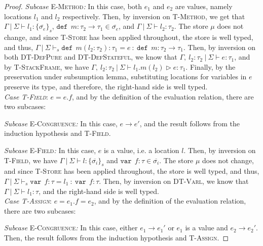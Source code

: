 \documentclass{llncs}
\newcommand{\keywadj}[1]{\mathtt{#1}}
\newcommand{\keyw}[1]{\keywadj{#1}~}
\begin{document}
\begin{proof}
\textit{Subcase} \textsc{E-Method}\textit{:} In this case, both $e_1$ and $e_2$ are values, namely locations $l_1$ and $l_2$ respectively. Then, by inversion on \textsc{T-Method}, we get that $\Gamma~|~\Sigma \vdash l_1 : \{ \overline{\sigma_e} \}_s$, $\keyw{def}~ m : \tau_2 \rightarrow \tau_1 \in \overline{\sigma_e}$, and $\Gamma~|~\Sigma \vdash l_2 : \tau_2$. The store $\mu$ does not change, and since \textsc{T-Store} has been applied throughout, the store is well typed, and thus, \mbox{$\Gamma~|~\Sigma \vdash_s \keyw{def}~ m(l_2 : \tau_2) : \tau_1 = e~:~\keyw{def}~ m : \tau_2 \rightarrow \tau_1$}. Then, by inversion on both \textsc{DT-DefPure} and \textsc{DT-DefStateful}, we know that $\Gamma,~l_2 : \tau_2~|~\Sigma \vdash e : \tau_1$, and by \textsc{T-StackFrame}, we have $\Gamma,~l_2 : \tau_2~|~\Sigma \vdash l_1.m(l_2) \rhd e : \tau_1$. Finally, by the preservation under subsumption lemma, substituting locations for variables in $e$ preserve its type, and therefore, the right-hand side is well typed.
\\

\noindent\textit{Case \textsc{T-Field}}:
$e = e.f$, and by the definition of the evaluation relation, there are two subcases:

\textit{Subcase} \textsc{E-Congruence}\textit{:} In this case, $e \longrightarrow e'$, and the result follows from the induction hypothesis and \textsc{T-Field}.

\textit{Subcase} \textsc{E-Field}\textit{:} In this case, $e$ is a value, i.e. a location $l$. Then, by inversion on  \textsc{T-Field}, we have $\Gamma~|~\Sigma \vdash l : \{ \overline{\sigma_i} \}_s$ and $\keyw{var}~ f : \tau \in \overline{\sigma_i}$. The store $\mu$ does not change, and since \textsc{T-Store} has been applied throughout, the store is well typed, and thus, \mbox{$\Gamma~|~\Sigma \vdash_s \keyw{var}~ f : \tau = l_1~:~\keyw{var}~ f : \tau$}. Then, by inversion on \textsc{DT-Varl}, we know that $\Gamma~|~\Sigma \vdash l_1 : \tau$, and the right-hand side is well typed.
\\

\noindent\textit{Case \textsc{T-Assign}}:
$e = e_1.f=e_2$, and by the definition of the evaluation relation, there are two subcases:

\textit{Subcase} \textsc{E-Congruence}\textit{:} In this case, either $e_1 \longrightarrow e_1'$ or $e_1$ is a value and $e_2 \longrightarrow e_2'$. Then, the result follows from the induction hypothesis and \textsc{T-Assign}.


\end{proof}
\end{document}
